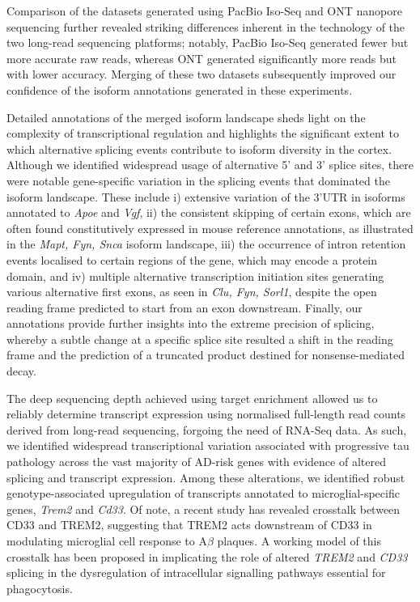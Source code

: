 Comparison of the datasets generated using PacBio Iso-Seq and ONT nanopore sequencing further revealed striking differences inherent in the technology of the two long-read sequencing platforms; notably, PacBio Iso-Seq generated fewer but more accurate raw reads, whereas ONT generated significantly more reads but with lower accuracy. Merging of these two datasets subsequently improved our confidence of the isoform annotations generated in these experiments.

Detailed annotations of the merged isoform landscape sheds light on the complexity of transcriptional regulation and highlights the significant extent to which alternative splicing events contribute to isoform diversity in the cortex. Although we identified widespread usage of alternative 5' and 3' splice sites, there were notable gene-specific variation in the splicing events that dominated the isoform landscape. These include i) extensive variation of the 3'UTR in isoforms annotated to \textit{Apoe} and \textit{Vgf}, ii) the consistent skipping of certain exons, which are often found constitutively expressed in mouse reference annotations, as illustrated in the \textit{Mapt, Fyn, Snca} isoform landscape, iii) the occurrence of intron retention events localised to certain regions of the gene, which may encode a protein domain, and iv) multiple alternative transcription initiation sites generating various alternative first exons, as seen in \textit{Clu, Fyn, Sorl1}, despite the open reading frame predicted to start from an exon downstream. Finally, our annotations provide further insights into the extreme precision of splicing, whereby a subtle change at a specific splice site resulted a shift in the reading frame and the prediction of a truncated product destined for nonsense-mediated decay. 

The deep sequencing depth achieved using target enrichment allowed us to reliably determine transcript expression using normalised full-length read counts derived from long-read sequencing, forgoing the need of RNA-Seq data. As such, we identified widespread transcriptional variation associated with progressive tau pathology across the vast majority of AD-risk genes with evidence of altered splicing and transcript expression. Among these alterations, we identified robust genotype-associated upregulation of transcripts annotated to microglial-specific genes, \textit{Trem2} and \textit{Cd33}. Of note, a recent study has revealed crosstalk between CD33 and TREM2, suggesting that TREM2 acts downstream of CD33 in modulating microglial cell response to A$\beta$ plaques\cite{Griciuc2019}. A working model of this crosstalk has been proposed in implicating the role of altered \textit{TREM2} and \textit{CD33} splicing in the dysregulation of intracellular signalling pathways essential for phagocytosis\cite{Griciuc2021}.

